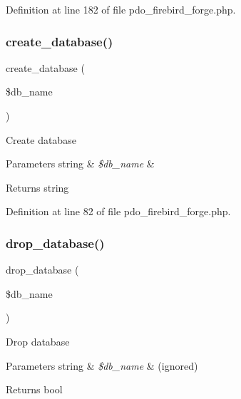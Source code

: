 Definition at line 182 of file pdo\+\_\+firebird\+\_\+forge.\+php.

\mbox{\label{class_c_i___d_b__pdo__firebird__forge_a902a7267babceb2ce595706f217e00ad}} 
\subsubsection{\texorpdfstring{create\_database()}{create\_database()}}
{\footnotesize\ttfamily create\+\_\+database (\begin{DoxyParamCaption}\item[{}]{\$db\+\_\+name }\end{DoxyParamCaption})}

Create database


\begin{DoxyParams}[1]{Parameters}
string & {\em \$db\+\_\+name} & \\
\hline
\end{DoxyParams}
\begin{DoxyReturn}{Returns}
string 
\end{DoxyReturn}


Definition at line 82 of file pdo\+\_\+firebird\+\_\+forge.\+php.

\mbox{\label{class_c_i___d_b__pdo__firebird__forge_a9612987b2d4230de2638d15857e92e67}} 
\subsubsection{\texorpdfstring{drop\_database()}{drop\_database()}}
{\footnotesize\ttfamily drop\+\_\+database (\begin{DoxyParamCaption}\item[{}]{\$db\+\_\+name }\end{DoxyParamCaption})}

Drop database


\begin{DoxyParams}[1]{Parameters}
string & {\em \$db\+\_\+name} & (ignored) \\
\hline
\end{DoxyParams}
\begin{DoxyReturn}{Returns}
bool 
\end{DoxyReturn}


